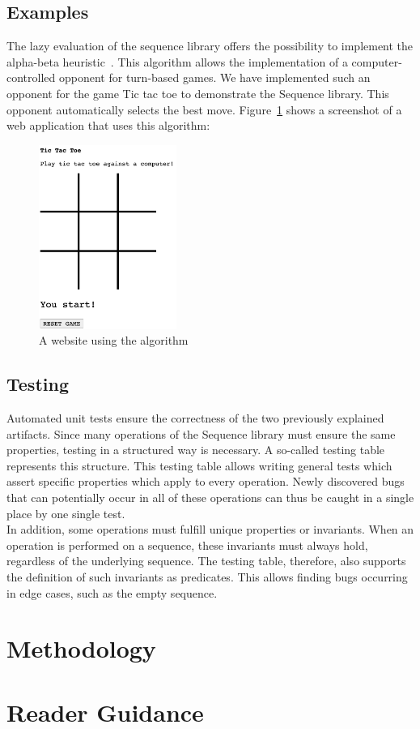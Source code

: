 \subsection*{Examples} %
\label{sub:introduction_Examples}
The lazy evaluation of the sequence library offers the possibility to implement
the alpha-beta heuristic~\cite[Ch. 5]{hughes_why_1989}. 
This algorithm allows the implementation of a computer-controlled opponent for
turn-based games. We have implemented such an opponent for the game Tic tac toe
to demonstrate the Sequence library. This opponent automatically selects the
best move. Figure~\ref{img:intro_ttt_playfield} shows a screenshot of a web
application that uses this algorithm:
\begin{figure}[H]
    \centering
    \includegraphics[width=0.4\textwidth]{./mainmatter/pictures/tic-tac-toe-field.jpg}
    \caption{A website using the algorithm}
    \label{img:intro_ttt_playfield}
\end{figure}

\subsection*{Testing} %
\label{sub:intro_Testing}

Automated unit tests ensure the correctness of the two previously explained
artifacts. Since many operations of the Sequence library must ensure the same
properties, testing in a structured way is necessary. A  so-called testing
table represents this structure. This testing table allows writing general
tests which assert specific properties which apply to every operation. Newly
discovered bugs that can potentially occur in all of these operations can thus
be caught in a single place by one single test.\\
In addition, some operations must fulfill unique properties or invariants. When
an operation is performed on a sequence, these invariants must always hold,
regardless of the underlying sequence. The testing table, therefore, also
supports the definition of such invariants as predicates. This allows finding
bugs occurring in edge cases, such as the empty sequence.



\section*{Methodology} %
\label{sec:Methodology}


\section*{Reader Guidance} %
\label{sec:Reader Guidance}

